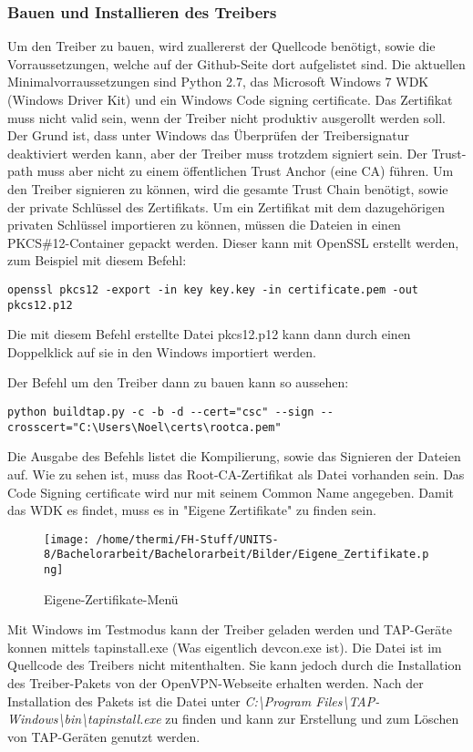\subsubsection{Bauen und Installieren des Treibers}
Um den Treiber zu bauen, wird zuallererst der Quellcode benötigt, sowie die
Vorraussetzungen, welche auf der Github-Seite dort aufgelistet sind.
Die aktuellen Minimalvorraussetzungen sind Python 2.7, das Microsoft Windows 7 WDK (Windows Driver Kit)
und ein Windows Code signing certificate.
Das Zertifikat muss nicht valid sein, wenn der Treiber nicht produktiv ausgerollt
werden soll. Der Grund ist, dass unter Windows das Überprüfen der Treibersignatur deaktiviert
werden kann, aber der Treiber muss trotzdem signiert sein. Der Trust-path muss aber nicht
zu einem öffentlichen Trust Anchor (eine CA) führen. Um den Treiber signieren zu können,
wird die gesamte Trust Chain benötigt, sowie der private Schlüssel des Zertifikats.
Um ein Zertifikat mit dem dazugehörigen privaten Schlüssel importieren zu können,
müssen die Dateien in einen PKCS\#12-Container gepackt werden. Dieser kann mit 
OpenSSL erstellt werden, zum Beispiel mit diesem Befehl:
\begin{lstlisting}[caption=OpenSSL PKCS\#12]
openssl pkcs12 -export -in key key.key -in certificate.pem -out pkcs12.p12
\end{lstlisting}
Die mit diesem Befehl erstellte Datei pkcs12.p12 kann dann durch einen Doppelklick auf sie
in den Windows importiert werden.

Der Befehl um den Treiber dann zu bauen kann so aussehen:
\begin{lstlisting}[caption=TAP-Windows bauen]
python buildtap.py -c -b -d --cert="csc" --sign --crosscert="C:\Users\Noel\certs\rootca.pem"
\end{lstlisting}
Die Ausgabe des Befehls listet die Kompilierung, sowie das Signieren der Dateien auf.
Wie zu sehen ist, muss das Root-CA-Zertifikat als Datei vorhanden sein.
Das Code Signing certificate wird nur mit seinem Common Name angegeben.
Damit das WDK es findet, muss es in "Eigene Zertifikate" zu finden sein.
\begin{figure}
\texttt{[image: /home/thermi/FH-Stuff/UNITS-8/Bachelorarbeit/Bachelorarbeit/Bilder/Eigene\_Zertifikate.png]}
\caption{Eigene-Zertifikate-Menü}
\label{fig:Eigene-Zertifikate-Menue}
\end{figure}

Mit Windows im Testmodus kann der Treiber geladen werden und TAP-Geräte konnen
mittels tapinstall.exe (Was eigentlich devcon.exe ist). Die Datei ist im Quellcode des
Treibers nicht mitenthalten. Sie kann jedoch durch die Installation des Treiber-Pakets
von der OpenVPN-Webseite erhalten werden. Nach der Installation des Pakets
ist die Datei unter \textit{C:\textbackslash{}Program Files\textbackslash{}TAP-Windows\textbackslash{}bin\textbackslash{}tapinstall.exe}
zu finden und kann zur Erstellung und zum Löschen von TAP-Geräten genutzt werden.

